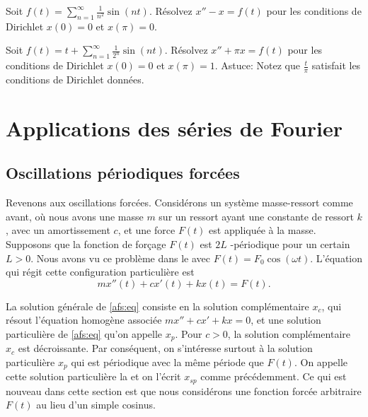 \begin{exercise}
Soit $f(t) = \sum_{n=1}^\infty \frac{1}{n^2} \sin(nt)$.  Résolvez
$x''- x = f(t)$ pour les conditions de Dirichlet $x(0) = 0$
et $x(\pi) = 0$.
\end{exercise}

\begin{exercise}[défi]
Soit $f(t) = t + \sum_{n=1}^\infty \frac{1}{2^n} \sin(nt)$.  Résolvez
$x'' + \pi x = f(t)$ pour les conditions de Dirichlet $x(0) = 0$
et $x(\pi) = 1$.  Astuce:  Notez que $\frac{t}{\pi}$ satisfait les conditions de Dirichlet données.
\end{exercise}



\sectionnewpage
\section{Applications des séries de Fourier}
\label{appoffourier:section}


\subsection{Oscillations périodiques forcées}

\begin{mywrapfigsimp}{2.0in}{2.3in}
\noindent
{}
\end{mywrapfigsimp}
Revenons aux oscillations forcées. Considérons un système masse-ressort comme
avant, où nous avons une masse $ m $
sur un ressort ayant une constante de ressort $ k $,
avec un amortissement $ c $, et une force $ F (t) $ est appliquée à la masse. Supposons que
la fonction de forçage $ F (t) $ est $ 2L $ -périodique pour un certain $ L> 0 $.
Nous avons vu
ce problème dans le  avec $ F (t) = F_0 \cos (\omega t) $. L'équation qui régit cette configuration particulière est
\begin{equation} \label{afs:eq}
mx''(t) + cx'(t) + kx(t) = F(t) .
\end{equation}

La solution générale de \eqref{afs:eq} consiste en la solution complémentaire $ x_c $, qui
résout l'équation homogène associée $ mx '' + cx '+ kx = 0 $, et
une solution particulière de \eqref{afs:eq} qu'on appelle $ x_p $. Pour $ c> 0 $,
la solution complémentaire $ x_c $ est décroissante.
Par conséquent, on s'intéresse surtout à la solution particulière $ x_p $ qui est périodique avec la même période que $ F (t) $. On appelle cette solution particulière la
\emph{} et on l'écrit  $ x_ {sp} $ comme précédemment.
Ce qui est nouveau dans cette section est que nous considérons une fonction forcée arbitraire $ F (t) $ au lieu d'un simple cosinus.

